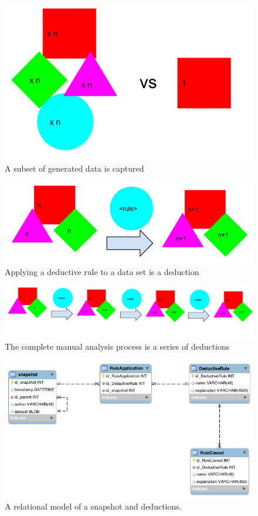\begin{figure}[h]
  \includegraphics[scale=0.6]{figures/data_captured}
  \caption{A subset of generated data is captured}
  \label{data_captured}
\end{figure}

\begin{figure}
  \includegraphics[scale=0.5]{figures/deduction}
  \caption{Applying a deductive rule to a data set is a deduction}
  \label{deduction}
\end{figure}

\begin{figure}
  \includegraphics[scale=0.25]{figures/deductive_process}
  \caption{The complete manual analysis process is a series of deductions}
  \label{deductive_process}
\end{figure}

\begin{figure}
  \includegraphics[scale=0.5]{figures/deduction_model}
  \caption{A relational model of a snapshot and deductions.}
  \label{deduction_model}
\end{figure}

